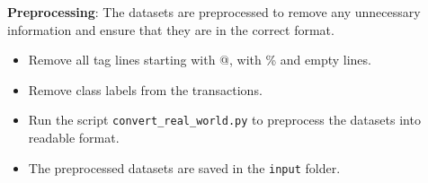 \textbf{Preprocessing}: The datasets are preprocessed to remove any unnecessary information and ensure that they are in the correct format.
\begin{itemize}
    \item Remove all tag lines starting with @, with \% and empty lines.
    \item Remove class labels from the transactions.
    \item Run the script \texttt{convert\_real\_world.py} to preprocess the datasets into readable format.
    \item The preprocessed datasets are saved in the \texttt{input} folder.
\end{itemize}
